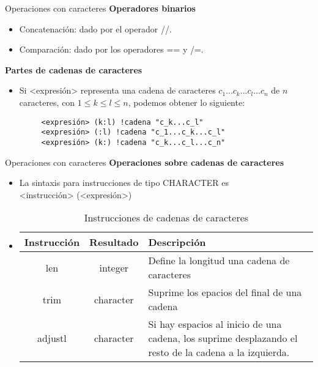 \begin{frame}[fragile]{Operaciones con caracteres}
\textbf{Operadores binarios}
 \begin{itemize}[<+(1)->]  
    \item Concatenación: dado por el operador //.
    \item Comparación: dado por los operadores == y /=.
 \end{itemize}

\textbf{Partes de cadenas de caracteres}
 \begin{itemize}[<+(2)->]  
    \item Si <expresión> representa una cadena de caracteres $c_{1}...c_{k}...c_{l}...c_{n}$ de $n$ caracteres, con $1 \leq k \leq l \leq n$, podemos obtener lo siguiente:
     \begin{verbatim}
     <expresión> (k:l) !cadena "c_k...c_l"
     <expresión> (:l) !cadena "c_1...c_k...c_l"
     <expresión> (k:) !cadena "c_k...c_l...c_n"
     \end{verbatim}  
 \end{itemize}
\end{frame}

\begin{frame}[fragile]{Operaciones con caracteres}
\textbf{Operaciones sobre cadenas de caracteres}
 \begin{itemize}[<+(2)->]
  \item La sintaxis para instrucciones de tipo CHARACTER es \\
    \centering <instrucción> (<expresión>)
  \item []
  \begin{table}[]
    \centering
    \label{Tabla_funcionesintr}
    \resizebox{10.5cm}{!} {
    \begin{tabular}{|c|c|p{6cm}|}
    \hline
    Instrucción  & Resultado  & Descripción                                                                                                    \\ \hline
    len          & integer    & Define la longitud una cadena de caracteres                                                                    \\ \hline
    trim         & character  & Suprime los epacios del final de una cadena                                                                    \\ \hline
    adjustl      & character  & Si hay espacios al inicio de una cadena, los suprime desplazando el resto de la cadena a la izquierda.        \\ \hline
    \end{tabular}}
    \caption*{Instrucciones de cadenas de caracteres}
    \end{table}
 \end{itemize}
\end{frame}


